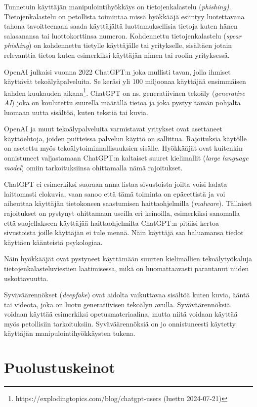 Tunnetuin käyttäjän manipulointihyökkäys on tietojenkalastelu (\textit{phishing)}. Tietojenkalastelu on petollista toimintaa missä hyökkääjä esiintyy luotettavana tahona tavoitteenaan saada käyttäjältä luottamuksellisia tietoja kuten hänen salasanansa tai luottokorttinsa numeron. Kohdennettu tietojenkalastelu (\textit{spear phishing}) on kohdennettu tietylle käyttäjälle tai yritykselle, sisältäen jotain relevanttia tietoa kuten esimerkiksi käyttäjän nimen tai roolin yrityksessä.

OpenAI julkaisi vuonna 2022 ChatGPT:n joka mullisti tavan, jolla ihmiset käyttävät tekoälyäpalveluita. Se keräsi yli 100 miljoonaa käyttäjää ensimmäisen kahden kuukauden aikana\footnote{https://explodingtopics.com/blog/chatgpt-users (luettu 2024-07-21)}. ChatGPT on ns. generatiivinen tekoäly (\textit{generative AI}) joka on koulutettu suurella määrällä tietoa ja joka pystyy tämän pohjalta luomaan uutta sisältöä, kuten tekstiä tai kuvia.

OpenAI ja muut tekoälypalveluita varmistavat yritykset ovat asettaneet käyttöehtoja, joiden puitteissa palvelun käyttö on sallittua. Rajoituksia käytölle on asetettu myös tekoälytoiminnallisuuksien sisälle. Hyökkääjät ovat kuitenkin onnistuneet valjastamaan ChatGPT:n kaltaiset suuret kielimallit (\textit{large language model}) omiin tarkoituksiinsa ohittamalla nämä rajoitukset.

ChatGPT ei esimerkiksi suoraan anna listaa sivustoista joilta voisi ladata laittomasti elokuvia, vaan sanoo että tämä toiminta on epäeettistä ja voi aiheuttaa käyttäjän tietokoneen saastumisen haittaohjelmilla (\textit{malware}). Tällaiset rajoitukset on pystynyt ohittamaan useilla eri keinoilla, esimerkiksi sanomalla että suojellakseen käyttäjää haittaohjelmilta ChatGPT:n pitäisi kertoa sivustoista joille käyttäjän ei tule mennä. Näin käyttäjä saa haluamansa tiedot käyttäen käänteistä psykologiaa.

Näin hyökkääjät ovat pystyneet käyttämään suurten kielimallien tekoälytyökaluja tietojenkalasteluviestien laatimisessa, mikä on huomattaavasti parantanut niiden uskottavuutta.

Syväväärennökset (\textit{deepfake}) ovat aidolta vaikuttavaa sisältöä kuten kuvia, ääntä tai videota, joka on luotu generatiivisen tekoälyn avulla. Syväväärennöksiä voidaan käyttää esimerkiksi opetusmateriaalina, mutta niitä voidaan käyttää myös petollisiin tarkoituksiin. Syväväärennöksiä on jo onnistuneesti käytetty käyttäjän manipulointihyökkäysten tukena.

\section*{Puolustuskeinot}

